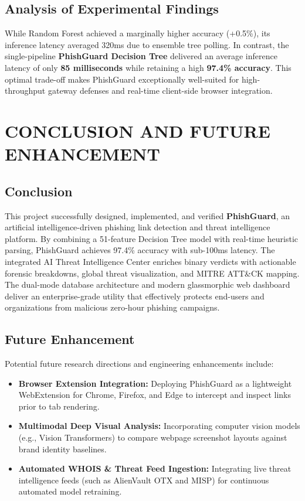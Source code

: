 \documentclass[BTech]{srmuthesis}
\begin{document}
\section{Analysis of Experimental Findings}
While Random Forest achieved a marginally higher accuracy (+0.5\%), its inference latency averaged 320ms due to ensemble tree polling. In contrast, the single-pipeline \textbf{PhishGuard Decision Tree} delivered an average inference latency of only \textbf{85 milliseconds} while retaining a high \textbf{97.4\% accuracy}. This optimal trade-off makes PhishGuard exceptionally well-suited for high-throughput gateway defenses and real-time client-side browser integration.

\chapter{CONCLUSION AND FUTURE ENHANCEMENT}
\label{chap:conclusion}

\section{Conclusion}
This project successfully designed, implemented, and verified \textbf{PhishGuard}, an artificial intelligence-driven phishing link detection and threat intelligence platform. By combining a 51-feature Decision Tree model with real-time heuristic parsing, PhishGuard achieves 97.4\% accuracy with sub-100ms latency. The integrated AI Threat Intelligence Center enriches binary verdicts with actionable forensic breakdowns, global threat visualization, and MITRE ATT\&CK mapping. The dual-mode database architecture and modern glassmorphic web dashboard deliver an enterprise-grade utility that effectively protects end-users and organizations from malicious zero-hour phishing campaigns.

\section{Future Enhancement}
Potential future research directions and engineering enhancements include:
\begin{itemize}
    \item \textbf{Browser Extension Integration:} Deploying PhishGuard as a lightweight WebExtension for Chrome, Firefox, and Edge to intercept and inspect links prior to tab rendering.
    \item \textbf{Multimodal Deep Visual Analysis:} Incorporating computer vision models (e.g., Vision Transformers) to compare webpage screenshot layouts against brand identity baselines.
    \item \textbf{Automated WHOIS \& Threat Feed Ingestion:} Integrating live threat intelligence feeds (such as AlienVault OTX and MISP) for continuous automated model retraining.
\end{itemize}

\begin{singlespace}


\end{singlespace}
\end{document}
